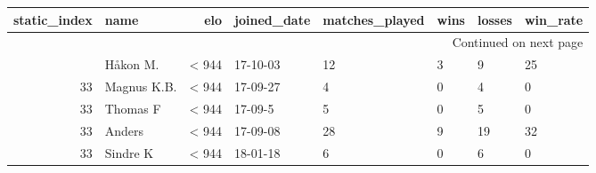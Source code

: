 \begin{longtable}{|r|l|r|l|l|l|l|l|}
\toprule
 static\_index &         name &    elo & joined\_date &  matches\_played &  wins &  losses &  win\_rate \\
\midrule
\endhead
\midrule
\multicolumn{8}{r}{{Continued on next page}} \\
\midrule
\endfoot

\bottomrule
\endlastfoot
           33 &     Håkon M. &  < 944 &    17-10-03 &              12 &     3 &       9 &        25 \\
           33 &  Magnus K.B. &  < 944 &    17-09-27 &               4 &     0 &       4 &         0 \\
           33 &     Thomas F &  < 944 &     17-09-5 &               5 &     0 &       5 &         0 \\
           33 &       Anders &  < 944 &    17-09-08 &              28 &     9 &      19 &        32 \\
           33 &     Sindre K &  < 944 &    18-01-18 &               6 &     0 &       6 &         0 \\
\end{longtable}
